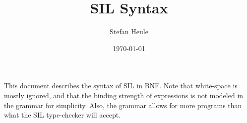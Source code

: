 \documentclass[]{article}
\title{SIL Syntax}
\author{Stefan Heule}
\date{\today}
\begin{document}
\maketitle


This document describes the syntax of SIL in BNF.  Note that white-space is
mostly ignored, and that the binding strength of expressions is not modeled
in the grammar for simplicity.  Also, the grammar allows for more programs
than what the SIL type-checker will accept.


\lstset{language=bnf}

\end{document}

